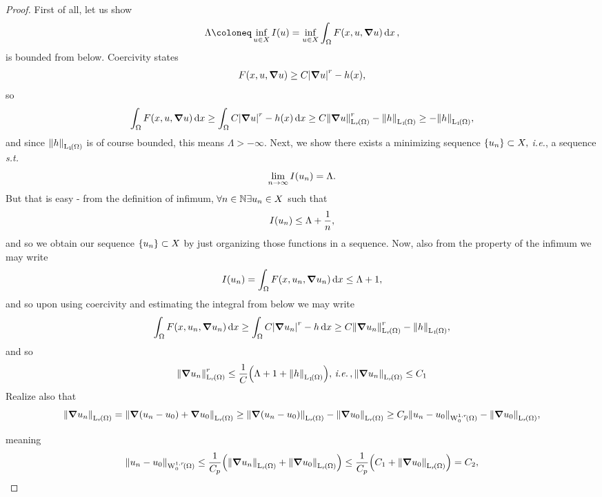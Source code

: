 \documentclass{article}
\begin{document}
\begin{proof}
    First of all, let us show
    \[
	    \Lambda \coloneq \inf_{u \in X} I(u) = \inf_{u \in X} \int_{\Omega}F\qty(x, u, \grad u)\dd{x},
    \]
    is bounded from below. Coercivity states
    \[
	    F\qty(x, u, \grad u) \geq C \abs{\grad u}^r - h(x),
    \]
    so
    \[
	   \int_{\Omega}F\qty(x, u, \grad u)\dd{x} \geq \int_{\Omega}C \abs{\grad u}^r - h(x)\dd{x} \geq C \norm{\grad u}_{\LpSet[r]{\Omega}}^r - \norm{h}_{\LpSet[1]{\Omega}} \geq - \norm{h}_{\LpSet[1]{\Omega}},
    \]
    and since $\norm{h}_{\LpSet[1]{\Omega}}$ is of course bounded, this means $\Lambda > - \infty.$ Next, we show there exists a minimizing sequence $\qty{u_n} \subset X,$ \textit{i.e.}, a sequence \textit{s.t.}
    \[
	    \lim_{n \to \infty}I\qty(u_n) = \Lambda.
    \]
    But that is easy - from the definition of infimum, $\forall n \in {\mathbb N} \exists u_n \in X$ such that
    \[
	    I\qty(u_n) \leq \Lambda + \frac{1}{n},
    \]
    and so we obtain our sequence $\qty{u_n} \subset X$ by just organizing those functions in a sequence. Now, also from the property of the infimum we may write
    \[
	    I(u_n) = \int_{\Omega}F\qty(x, u_n, \grad u_n)\dd{x} \leq \Lambda + 1,
    \]
    and so upon using coercivity and estimating the integral from below we may write
    \[
	    \int_{\Omega}F\qty(x, u_n, \grad u_n)\dd{x} \geq \int_{\Omega}C \abs{\grad u_n}^r - h\dd{x} \geq C \norm{\grad u_n}^r_{\LpSet[r]{\Omega}} - \norm{h}_{\LpSet[1]{\Omega}},
    \]
    and so
    \[
	    \norm{\grad u_n}_{\LpSet[r]{\Omega}}^r \leq \frac{1}{C}\qty(\Lambda + 1 + \norm{h}_{\LpSet[1]{\Omega}}), \, \text{\textit{i.e.}} \,, \norm{\grad u_n}_{\LpSet[r]{\Omega}} \leq C_1
    \]
    Realize also that
    \[
	    \norm{\grad u_n}_{\LpSet[r]{\Omega}} = \norm{\grad\qty(u_n - u_0) + \grad u_0}_{\LpSet[r]{\Omega}} \geq \norm{\grad\qty(u_n - u_0)}_{\LpSet[r]{\Omega}} - \norm{\grad u_0}_{\LpSet[r]{\Omega}} \geq C_p \norm{u_n - u_0}_{\WkpzeroSet[1][r]{\Omega}} - \norm{\grad u_0}_{\LpSet[r]{\Omega}},
    \]

meaning
\[
	\norm{u_n-u_0}_{\WkpzeroSet[1][r]{\Omega}} \leq \frac{1}{C_p}\qty(\norm{\grad u_n}_{\LpSet[r]{\Omega}}+ \norm{\grad u_0}_{\LpSet[r]{\Omega}}) \leq \frac{1}{C_p}\qty(C_1 + \norm{\grad u_0}_{\LpSet[r]{\Omega}}) = C_2,
\]


\end{proof}
\end{document}

